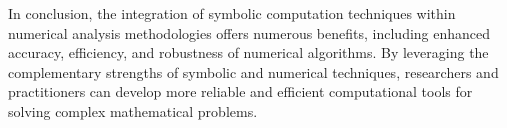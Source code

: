 In conclusion, the integration of symbolic computation techniques within numerical analysis methodologies offers numerous benefits, including enhanced accuracy, efficiency, and robustness of numerical algorithms. By leveraging the complementary strengths of symbolic and numerical techniques, researchers and practitioners can develop more reliable and efficient computational tools for solving complex mathematical problems.

